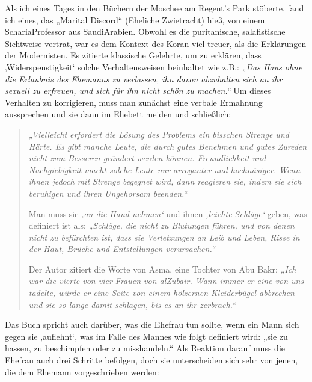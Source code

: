 \documentclass[12pt]{memoir}
\begin{document}
Als ich eines Tages in den Büchern der Moschee am Regent’s Park stöberte,
fand ich eines, das „Marital Discord“ (Eheliche Zwietracht) hieß,
von einem Scharia\–Professor aus Saudi\–Arabien.
Obwohl es die puritanische, salafistische Sichtweise vertrat,
war es dem Kontext des Koran viel treuer,
als die Erklärungen der Modernisten.
Es zitierte klassische Gelehrte, um zu erklären,
dass ‚Widerspenstigkeit‘ solche Verhaltensweisen beinhaltet wie z.B.:
\emph{„Das Haus ohne die Erlaubnis des Ehemanns zu verlassen,
ihn davon abzuhalten sich an ihr sexuell zu erfreuen,
und sich für ihn nicht schön zu machen.“}
Um dieses Verhalten zu korrigieren,
muss man zunächst eine verbale Ermahnung aussprechen
und sie dann im Ehebett meiden und schließlich:

\begin{quote}
\emph{%
„Vielleicht erfordert die Lösung des Problems ein bisschen Strenge und Härte.
Es gibt manche Leute, die durch gutes Benehmen und gutes Zureden
nicht zum Besseren geändert werden können.
Freundlichkeit und Nachgiebigkeit macht solche Leute
nur arroganter und hochnäsiger.
Wenn ihnen jedoch mit Strenge begegnet wird,
dann reagieren sie, indem sie sich beruhigen und ihren Ungehorsam beenden.“}

Man muss sie \emph{‚an die Hand nehmen‘}
und ihnen \emph{‚leichte Schläge‘} geben,
was definiert ist als:
\emph{„Schläge, die nicht zu Blutungen führen,
und von denen nicht zu befürchten ist,
dass sie Verletzungen an Leib und Leben,
Risse in der Haut, Brüche und Entstellungen verursachen.“}

Der Autor zitiert die Worte von Asma, eine Tochter von Abu Bakr:
\emph{„Ich war die vierte von vier Frauen von al\–Zubair.
Wann immer er eine von uns tadelte,
würde er eine Seite von einem hölzernen Kleiderbügel abbrechen
und sie so lange damit schlagen, bis es an ihr zerbrach.“}
\end{quote}

Das Buch spricht auch darüber, was die Ehefrau tun sollte,
wenn ein Mann sich gegen sie ‚auflehnt‘,
was im Falle des Mannes wie folgt definiert wird: „sie zu hassen,
zu beschimpfen oder zu misshandeln.“
Als Reaktion darauf muss die Ehefrau auch drei Schritte befolgen,
doch sie unterscheiden sich sehr von jenen,
die dem Ehemann vorgeschrieben werden:
\end{document}
